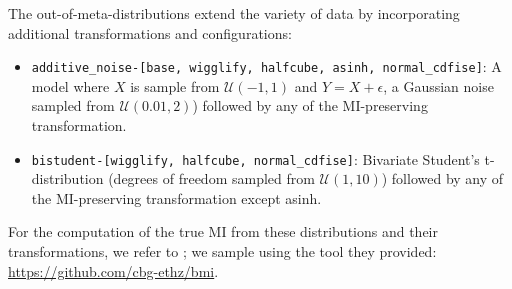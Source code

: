 The out-of-meta-distributions extend the variety of data by incorporating additional transformations and configurations:
\begin{itemize}
    \item \texttt{additive\_noise-[base, wigglify, halfcube, asinh, normal\_cdfise]}: A model where $X$ is sample from  $\mathcal{U}(-1, 1)$ and $Y = X + \epsilon$, a Gaussian noise sampled from $\mathcal{U}(0.01, 2)$) followed by any of the MI-preserving transformation.
    \item \texttt{bistudent-[wigglify, halfcube, normal\_cdfise]}: Bivariate Student's t-distribution (degrees of freedom sampled from $\mathcal{U}(1, 10)$) followed by any of the MI-preserving transformation except asinh.
\end{itemize}


For the computation of the true MI from these distributions and their transformations, we refer to \cite{NEURIPS2023_36b80eae}; we sample using the tool they provided: \url{https://github.com/cbg-ethz/bmi}.

